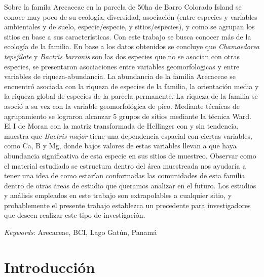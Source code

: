 \documentclass[11pt,]{article}
\renewenvironment{abstract}
 {{%
    \setlength{\leftmargin}{0mm}
    \setlength{\rightmargin}{\leftmargin}%
  }%
  \relax}
 {\endlist}
\begin{document}
\begin{abstract}

    \hbox{\vrule height .2pt width 39.14pc}

    \vskip 8.5pt %

\noindent Sobre la famila Arecaceae en la parcela de 50ha de Barro Colorado Island
se conoce muy poco de su ecología, diversidad, asociación (entre
especies y variables ambientales y de suelo, especie/especie, y
sitios/especies), y como se agrupan los sitios en base a sus
características. Con este trabajo se busca conocer más de la ecología de
la familia. En base a los datos obtenidos se concluye que
\emph{Chamaedorea tepejilote} y \emph{Bactris barronis} son las dos
especies que no se asocian con otras especies, se presentaron
asociaciones entre variables geomorfologicas y entre variables de
riqueza-abundancia. La abundancia de la familia Arecaceae se encuentró
asociada con la riqueza de especies de la familia, la orientación media
y la riqueza global de especies de la parcela permanente. La riqueza de
la familia se asoció a su vez con la variable geomorfológica de pico.
Mediante técnicas de agrupamiento se lograron alcanzar 5 grupos de
sitios mediante la técnica Ward. El I de Moran con la matriz
transformada de Hellinger con y sin tendencia, muestra que \emph{Bactris
major} tiene una dependencia espacial con ciertas variables, como Ca, B
y Mg, donde bajos valores de estas variables llevan a que haya
abundancia significativa de esta especie en sus sitios de muestreo.
Observar como el material estudiado se estructura dentro del área
muestreada nos ayudaría a tener una idea de como estarían conformadas
las comunidades de esta familia dentro de otras áreas de estudio que
queramos analizar en el futuro. Los estudios y análisis empleados en
este trabajo son extrapolables a cualquier sitio, y probablemente el
presente trabajo establezca un precedente para investigadores que deseen
realizar este tipo de investigación.


\vskip 8.5pt \noindent \emph{Keywords}: Arecaceae, BCI, Lago Gatún, Panamá \par

    \hbox{\vrule height .2pt width 39.14pc}



\end{abstract}


\vskip 6.5pt


\noindent  \section{Introducción}\label{introducciuxf3n}
\end{document}
